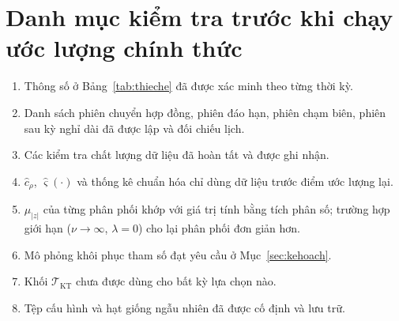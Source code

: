 \documentclass[12pt,a4paper]{article}
\theoremstyle{definition}
\theoremstyle{remark}
\begin{document}
\section{Danh mục kiểm tra trước khi chạy ước lượng chính thức}

\begin{enumerate}
\item Thông số ở Bảng~\ref{tab:thieche} đã được xác minh theo từng thời kỳ.
\item Danh sách phiên chuyển hợp đồng, phiên đáo hạn, phiên chạm biên, phiên sau kỳ nghỉ dài đã được lập và đối chiếu lịch.
\item Các kiểm tra chất lượng dữ liệu đã hoàn tất và được ghi nhận.
\item $\hat c_\rho$, $\hat\varsigma(\cdot)$ và thống kê chuẩn hóa chỉ dùng dữ liệu trước điểm ước lượng lại.
\item $\mu_{|z|}$ của từng phân phối khớp với giá trị tính bằng tích phân số; trường hợp giới hạn ($\nu\to\infty$, $\lambda=0$) cho lại phân phối đơn giản hơn.
\item Mô phỏng khôi phục tham số đạt yêu cầu ở Mục~\ref{sec:kehoach}.
\item Khối $\mathcal T_{\mathrm{KT}}$ chưa được dùng cho bất kỳ lựa chọn nào.
\item Tệp cấu hình và hạt giống ngẫu nhiên đã được cố định và lưu trữ.
\end{enumerate}
\end{document}
